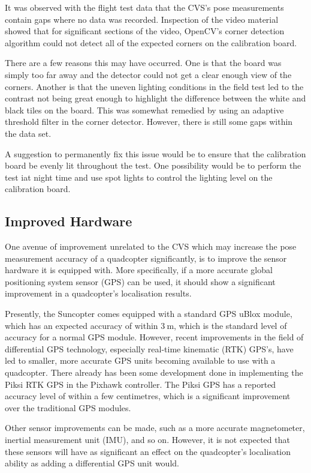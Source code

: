 It was observed with the flight test data that the CVS's pose measurements contain gaps where no data was recorded. Inspection of the video material showed that for significant sections of the video, OpenCV's corner detection algorithm could not detect all of the expected corners on the calibration board. 

There are a few reasons this may have occurred. One is that the board was simply too far away and the detector could not get a clear enough view of the corners. Another is that the uneven lighting conditions in the field test led to the contrast not being great enough to highlight the difference between the white and black tiles on the board. This was somewhat remedied by using an adaptive threshold filter in the corner detector. However, there is still some gaps within the data set. 

A suggestion to permanently fix this issue would be to ensure that the calibration board be evenly lit throughout the test. One possibility would be to perform the test iat night time and use spot lights to control the lighting level on the calibration board. 

\subsection{Improved Hardware}

One avenue of improvement unrelated to the CVS which may increase the pose measurement accuracy of a quadcopter significantly, is to improve the sensor hardware it is equipped with. More specifically, if a more accurate global positioning system sensor (GPS) can be used, it should show a significant improvement in a quadcopter's localisation results. 

Presently, the Suncopter comes equipped with a standard GPS uBlox module, which has an expected accuracy of within $\SI{3}{\m}$, which is the standard level of accuracy for a normal GPS module. However, recent improvements in the field of differential GPS technology, especially real-time kinematic (RTK) GPS's, have led to smaller, more accurate GPS units becoming available to use with a quadcopter. There already has been some development done in implementing the Piksi RTK GPS in the Pixhawk controller. The Piksi GPS has a reported accuracy level of within a few centimetres, which is a significant improvement over the traditional GPS modules. 

Other sensor improvements can be made, such as a more accurate magnetometer, inertial measurement unit (IMU), and so on. However, it is not expected that these sensors will have as significant an effect on the quadcopter's localisation ability as adding a differential GPS unit would. 

